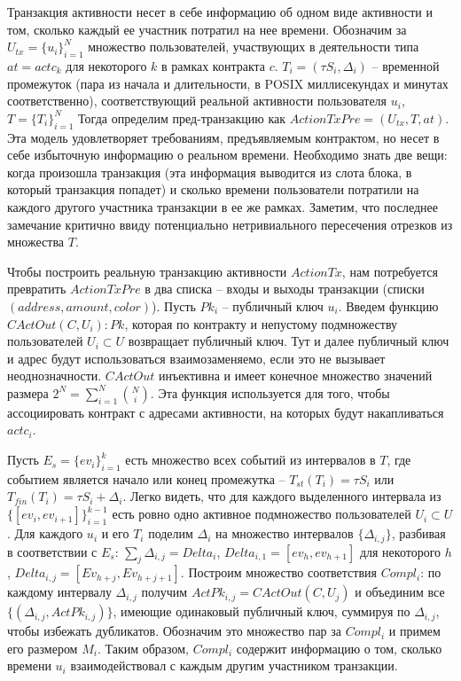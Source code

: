 \documentclass[specification,annotation]{itmo-student-thesis}
\begin{document}
Транзакция активности несет в себе информацию об одном виде активности
и том, сколько каждый ее участник потратил на нее времени. Обозначим
за $U_{tx} = \{u_i\}_{i=1}^N$ множество пользователей, участвующих в
деятельности типа $at = actc_k$ для некоторого $k$ в рамках контракта
$c$. $T_i = (\tau S_i, \Delta_i)$ -- временной промежуток (пара из
начала и длительности, в POSIX миллисекундах и минутах
соответственно), соответствующий реальной активности пользователя
$u_i$, $T = \{T_i\}_{i=1}^N$ Тогда определим пред-транзакцию как
$ActionTxPre = (U_{tx}, T, at)$. Эта модель удовлетворяет требованиям,
предъявляемым контрактом, но несет в себе избыточную информацию о
реальном времени. Необходимо знать две вещи: когда произошла
транзакция (эта информация выводится из слота блока, в который
транзакция попадет) и сколько времени пользователи потратили на
каждого другого участника транзакции в ее же рамках. Заметим, что
последнее замечание критично ввиду потенциально нетривиального
пересечения отрезков из множества $T$.

Чтобы построить реальную транзакцию активности $ActionTx$, нам
потребуется превратить $ActionTxPre$ в два списка -- входы и выходы
транзакции (списки $(address,amount,color)$). Пусть $Pk_i$ --
публичный ключ $u_i$. Введем функцию $CActOut(C, U_i) : Pk$, которая
по контракту и непустому подмножеству пользователей $U_i \subset U$
возвращает публичный ключ. Тут и далее публичный ключ и адрес будут
использоваться взаимозаменяемо, если это не вызывает
неоднозначности. $CActOut$ инъективна и имеет конечное множество
значений размера $2^N = \sum_{i=1}^N{\binom{N}{i}}$. Эта функция
используется для того, чтобы ассоциировать контракт с адресами
активности, на которых будут накапливаться $actc_i$.

Пусть $E_s = \{ev_i\}_{i=1}^k$ есть множество всех событий из
интервалов в $T$, где событием является начало или конец промежутка --
$T_{st}(T_i) = \tau S_i$ или $T_{fin}(T_i) = \tau S_i +
\Delta_i$. Легко видеть, что для каждого выделенного интервала из
$\{[ev_i, ev_{i+1}]\}_{i=1}^{k-1}$ есть ровно одно активное
подмножество пользователей $U_i \subset U$. Для каждого $u_i$ и его
$T_i$ поделим $\Delta_i$ на множество интервалов $\{\Delta_{i,j}\}$,
разбивая в соответствии с $E_s$: $\sum_{j}{\Delta_{i,j}} = Delta_i$,
$Delta_{i,1} = [ev_h, ev_{h+1}]$ для некоторого $h$, $Delta_{i,j} =
[Ev_{h+j},Ev_{h+j+1}]$. Построим множество соответствия $Compl_i$: по
каждому интервалу $\Delta_{i,j}$ получим $ActPk_{i,j} = CActOut(C,
U_j)$ и объединим все $\{(\Delta_{i,j}, ActPk_{i,j})\}$, имеющие
одинаковый публичный ключ, суммируя по $\Delta_{i,j}$, чтобы избежать
дубликатов. Обозначим это множество пар за $Compl_i$ и примем его
размером $M_i$. Таким образом, $Compl_i$ содержит информацию о том,
сколько времени $u_i$ взаимодействовал с каждым другим участником
транзакции.
\end{document}
